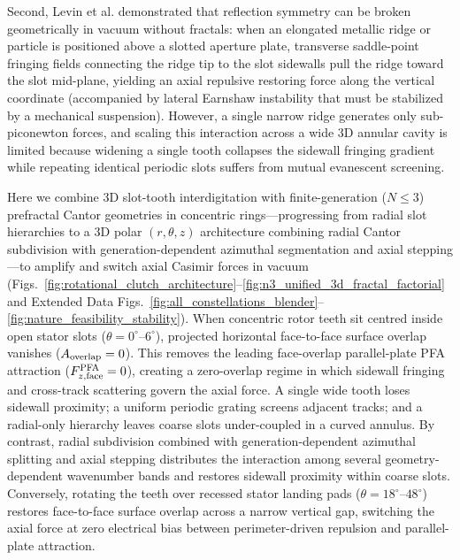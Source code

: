 \documentclass[pdflatex,sn-nature]{sn-jnl}
\begin{document}
Second, Levin et al.\cite{levin2010} demonstrated that reflection symmetry can be broken geometrically in vacuum without fractals: when an elongated metallic ridge or particle is positioned above a slotted aperture plate, transverse saddle-point fringing fields connecting the ridge tip to the slot sidewalls pull the ridge toward the slot mid-plane, yielding an axial repulsive restoring force along the vertical coordinate (accompanied by lateral Earnshaw instability that must be stabilized by a mechanical suspension)\cite{levin2010,rodriguez2011}. However, a single narrow ridge generates only sub-piconewton forces\cite{levin2010,rodriguez2011}, and scaling this interaction across a wide 3D annular cavity is limited because widening a single tooth collapses the sidewall fringing gradient while repeating identical periodic slots suffers from mutual evanescent screening.

Here we combine 3D slot-tooth interdigitation with finite-generation ($N \le 3$) prefractal Cantor geometries in concentric rings---progressing from radial slot hierarchies to a 3D polar $(r, \theta, z)$ architecture combining radial Cantor subdivision with generation-dependent azimuthal segmentation and axial stepping---to amplify and switch axial Casimir forces in vacuum (Figs.~\ref{fig:rotational_clutch_architecture}--\ref{fig:n3_unified_3d_fractal_factorial} and Extended Data Figs.~\ref{fig:all_constellations_blender}--\ref{fig:nature_feasibility_stability}). When concentric rotor teeth sit centred inside open stator slots ($\theta = 0^\circ\text{--}6^\circ$), projected horizontal face-to-face surface overlap vanishes ($A_{\rm overlap} = 0$). This removes the leading face-overlap parallel-plate PFA attraction ($F_{z,\rm face}^{\rm PFA} = 0$), creating a zero-overlap regime in which sidewall fringing and cross-track scattering govern the axial force. A single wide tooth loses sidewall proximity; a uniform periodic grating screens adjacent tracks; and a radial-only hierarchy leaves coarse slots under-coupled in a curved annulus. By contrast, radial subdivision combined with generation-dependent azimuthal splitting and axial stepping distributes the interaction among several geometry-dependent wavenumber bands and restores sidewall proximity within coarse slots. Conversely, rotating the teeth over recessed stator landing pads ($\theta = 18^\circ\text{--}48^\circ$) restores face-to-face surface overlap across a narrow vertical gap, switching the axial force at zero electrical bias between perimeter-driven repulsion and parallel-plate attraction.
\end{document}
